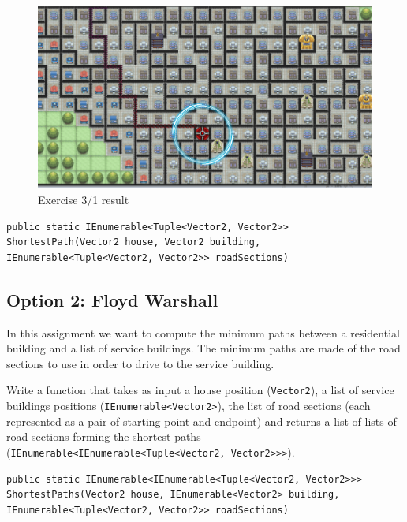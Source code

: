 \documentclass[10pt,a4paper]{article}
\begin{document}
\begin{figure}
\centering
\includegraphics[scale=0.25]{img/exercise3}
\caption{Exercise 3/1 result}
\label{img:Ex3-1}
\end{figure}


\begin{lstlisting}
public static IEnumerable<Tuple<Vector2, Vector2>> ShortestPath(Vector2 house, Vector2 building, IEnumerable<Tuple<Vector2, Vector2>> roadSections)
\end{lstlisting}

\subsection*{Option 2: Floyd Warshall}
In this assignment we want to compute the minimum paths between a residential building and a list of service buildings. The minimum paths are made of the road sections to use in order to drive to the service building.

Write a function that takes as input a house position (\texttt{Vector2}), a list of service buildings positions (\texttt{IEnumerable<Vector2>}), the list of road sections (each represented as a pair of starting point and endpoint) and returns a list of lists of road sections forming the shortest paths (\texttt{IEnumerable<IEnumerable<Tuple<Vector2, Vector2>>>}).

\begin{lstlisting}
public static IEnumerable<IEnumerable<Tuple<Vector2, Vector2>>> ShortestPaths(Vector2 house, IEnumerable<Vector2> building, IEnumerable<Tuple<Vector2, Vector2>> roadSections)
\end{lstlisting}
\end{document}
